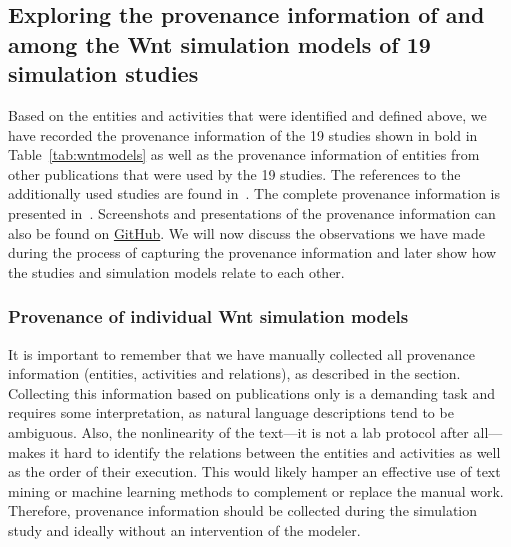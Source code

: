 \documentclass[10pt,letterpaper]{article}
\newcommand{\wnt}{Wnt}
\begin{document}
\subsection*{Exploring the provenance information of and among the \wnt{} simulation models of 19 simulation studies}





Based on the entities and activities that were identified and defined above, we have recorded the provenance information of the 19 studies shown in bold in Table~\ref{tab:wntmodels} as well as the provenance information of entities from other publications that were used by the 19 studies.
The references to the additionally used studies are found in~.
The complete provenance information is presented in~.
Screenshots and presentations of the provenance information can also be found on \href{https://github.com/SFB-ELAINE/SI_Provenance_Wnt_Family}{GitHub}.
We will now discuss the observations we have made during the process of capturing the provenance information and later show how the studies and simulation models relate to each other.


\subsubsection*{Provenance of individual \wnt{} simulation models}

It is important to remember that we have manually collected all provenance information (entities, activities and relations), as described in the  section.
Collecting this information based on publications only is a demanding task and requires some interpretation, as natural language descriptions tend to be ambiguous.
Also, the nonlinearity of the text---it is not a lab protocol after all---makes it hard to identify the relations between the entities and activities as well as the order of their execution.
This would likely hamper an effective use of text mining or machine learning methods to complement or replace the manual work.
Therefore, provenance information should be collected during the simulation study and ideally without an intervention of the modeler.
\end{document}
